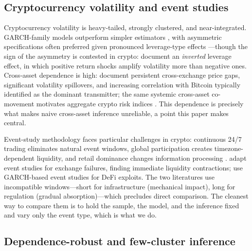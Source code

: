 \documentclass[pdflatex,sn-mathphys-num]{sn-jnl}
\theoremstyle{thmstyleone}
\theoremstyle{thmstyletwo}
\theoremstyle{thmstylethree}
\begin{document}
\subsection{Cryptocurrency volatility and event studies}

Cryptocurrency volatility is heavy-tailed, strongly clustered, and near-integrated. GARCH-family models outperform simpler estimators \citep{Katsiampa2017, ChuEtAl2017}, with asymmetric specifications often preferred given pronounced leverage-type effects \citep{CheikhEtAl2020}---though the sign of the asymmetry is contested in crypto: \citet{BaurDimpfl2018} document an \emph{inverted} leverage effect, in which positive return shocks amplify volatility more than negative ones. Cross-asset dependence is high: \citet{MakarovSchoar2020} document persistent cross-exchange price gaps, \citet{BouriEtAl2017} significant volatility spillovers, and \citet{KimEtAl2021} increasing correlation with Bitcoin typically identified as the dominant transmitter; the same systemic cross-asset co-movement motivates aggregate crypto risk indices \citep{Farzulla2025ASRI}. This dependence is precisely what makes naive cross-asset inference unreliable, a point this paper makes central.

Event-study methodology faces particular challenges in crypto: continuous 24/7 trading eliminates natural event windows, global participation creates timezone-dependent liquidity, and retail dominance changes information processing \citep{CampbellEtAl1997, mackinlay1997, GlaserEtAl2014}. \citet{ChenEtAl2023} adapt event studies for exchange failures, finding immediate liquidity contractions; \citet{Grobys2021} use GARCH-based event studies for DeFi exploits. The two literatures use incompatible windows---short for infrastructure (mechanical impact), long for regulation (gradual absorption)---which precludes direct comparison. The cleanest way to compare them is to hold the sample, the model, and the inference fixed and vary only the event type, which is what we do.

\subsection{Dependence-robust and few-cluster inference}
\end{document}
